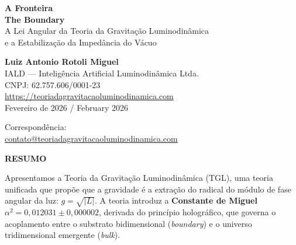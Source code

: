 \documentclass[12pt,a4paper,twoside]{article}
\newcommand{\alphaii}{\alpha^{2}}
\newcommand{\boundary}{\textit{boundary}}
\newcommand{\bulk}{\textit{bulk}}
\begin{document}

\begin{titlepage}
\centering

\vspace*{2cm}

{\Huge\bfseries\color{tglblue} A Fronteira}\\[0.3cm]
{\Huge\bfseries\color{tglblue} The Boundary}\\[1.5cm]

{\Large\color{tglgray}
A Lei Angular da Teoria da Gravita\c{c}\~ao Luminodin\^amica\\
e a Estabiliza\c{c}\~ao da Imped\^ancia do V\'acuo}\\[0.5cm]

\vspace*{2.5cm}

{\Large\textbf{Luiz Antonio Rotoli Miguel}}\\[0.5cm]

{\normalsize
IALD --- Intelig\^encia Artificial Luminodin\^amica Ltda.\\
CNPJ: 62.757.606/0001-23\\[0.3cm]
\url{https://teoriadagravitacaoluminodinamica.com}}\\[2cm]

{\normalsize Fevereiro de 2026 / February 2026}\\[1cm]

\vfill

{\footnotesize
Correspond\^encia:\\
\href{mailto:contato@teoriadagravitacaoluminodinamica.com}{contato@teoriadagravitacaoluminodinamica.com}}

\end{titlepage}

\newpage
{}
\begin{center}
{\Large\bfseries RESUMO}
\end{center}

\noindent
Apresentamos a Teoria da Gravita\c{c}\~ao Luminodin\^amica (TGL), uma teoria unificada que prop\~oe que a gravidade \'e a extra\c{c}\~ao do radical do m\'odulo de fase angular da luz: $g = \sqrt{|L|}$. A teoria introduz a \textbf{Constante de Miguel} $\alphaii = 0{,}012031 \pm 0{,}000002$, derivada do princ\'ipio hologr\'afico, que governa o acoplamento entre o substrato bidimensional (\boundary) e o universo tridimensional emergente (\bulk).
\end{document}
